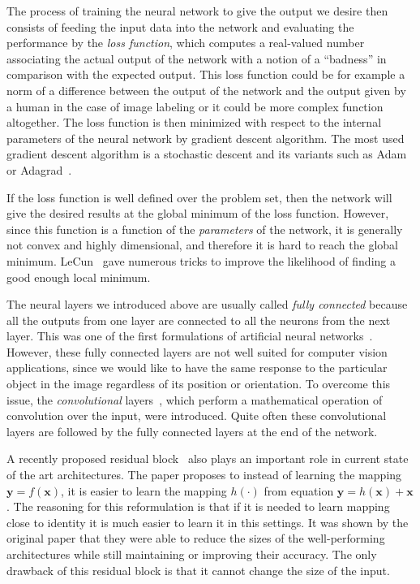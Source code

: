The process of training the neural network to give the output we desire then consists of feeding the input data into the network and evaluating the performance by the {\em loss function}, which computes a real-valued number associating the actual output of the network with a notion of a ``badness'' in comparison with the expected output. This loss function could be for example a norm of a difference between the output of the network and the output given by a human in the case of image labeling or it could be more complex function altogether. The loss function is then minimized with respect to the internal parameters of the neural network by gradient descent algorithm. The most used gradient descent algorithm is a stochastic descent and its variants such as Adam~\cite{adam} or Adagrad~\cite{adagrad}.

If the loss function is well defined over the problem set, then the network will give the desired results at the global minimum of the loss function. However, since this function is a function of the {\em parameters} of the network, it is generally not convex and highly dimensional, and therefore it is hard to reach the global minimum. LeCun~\cite{efbackprop} gave numerous tricks to improve the likelihood of finding a good enough local minimum.

The neural layers we introduced above are usually called {\em fully connected} because all the outputs from one layer are connected to all the neurons from the next layer. This was one of the first formulations of artificial neural networks~\cite{orignet}. However, these fully connected layers are not well suited for computer vision applications, since we would like to have the same response to the particular object in the image regardless of its position or orientation. To overcome this issue, the {\em convolutional} layers~\cite{convnet}, which perform a mathematical operation of convolution over the input, were introduced. Quite often these convolutional layers are followed by the fully connected layers at the end of the network.

A recently proposed residual block~\cite{resnet} also plays an important role in current state of the art architectures. The paper proposes to instead of learning the mapping $\bm{y} = f(\bm{x})$, it is easier to learn the mapping $h(\cdot)$ from equation $\bm{y} = h(\bm{x}) + \bm{x}$. The reasoning for this reformulation is that if it is needed to learn mapping close to identity it is much easier to learn it in this settings. It was shown by the original paper that they were able to reduce the sizes of the well-performing architectures while still maintaining or improving their accuracy. The only drawback of this residual block is that it cannot change the size of the input.

